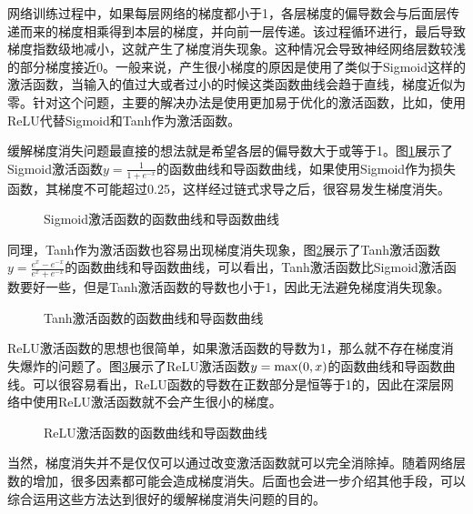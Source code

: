 \parinterval  网络训练过程中，如果每层网络的梯度都小于1，各层梯度的偏导数会与后面层传递而来的梯度相乘得到本层的梯度，并向前一层传递。该过程循环进行，最后导致梯度指数级地减小，这就产生了梯度消失现象。这种情况会导致神经网络层数较浅的部分梯度接近0。一般来说，产生很小梯度的原因是使用了类似于Sigmoid这样的激活函数，当输入的值过大或者过小的时候这类函数曲线会趋于直线，梯度近似为零。针对这个问题，主要的解决办法是使用更加易于优化的激活函数，比如，使用ReLU代替Sigmoid和Tanh作为激活函数。

\parinterval  缓解梯度消失问题最直接的想法就是希望各层的偏导数大于或等于1。图\ref{fig:5-48}展示了Sigmoid激活函数$ y=\frac{1}{1+e^{-x}}$的函数曲线和导函数曲线，如果使用Sigmoid作为损失函数，其梯度不可能超过0.25，这样经过链式求导之后，很容易发生梯度消失。

\begin{figure}[htp]
\centering

\caption{Sigmoid激活函数的函数曲线和导函数曲线}
\label{fig:5-48}
\end {figure}

\parinterval  同理，Tanh作为激活函数也容易出现梯度消失现象，图\ref{fig:5-49}展示了Tanh激活函数$ y=\frac{e^x-e^{-x}}{e^x+e^{-x}}$的函数曲线和导函数曲线，可以看出，Tanh激活函数比Sigmoid激活函数要好一些，但是Tanh激活函数的导数也小于1，因此无法避免梯度消失现象。

\begin{figure}[htp]
\centering

\caption{Tanh激活函数的函数曲线和导函数曲线}
\label{fig:5-49}
\end {figure}

\parinterval  ReLU激活函数的思想也很简单，如果激活函数的导数为1，那么就不存在梯度消失爆炸的问题了。图\ref{fig:5-50}展示了ReLU激活函数$ y={\rm{max}}(0,x)$的函数曲线和导函数曲线。可以很容易看出，ReLU函数的导数在正数部分是恒等于1的，因此在深层网络中使用ReLU激活函数就不会产生很小的梯度。

\begin{figure}[htp]
\centering

\caption{ReLU激活函数的函数曲线和导函数曲线}
\label{fig:5-50}
\end {figure}

\parinterval  当然，梯度消失并不是仅仅可以通过改变激活函数就可以完全消除掉。随着网络层数的增加，很多因素都可能会造成梯度消失。后面也会进一步介绍其他手段，可以综合运用这些方法达到很好的缓解梯度消失问题的目的。

